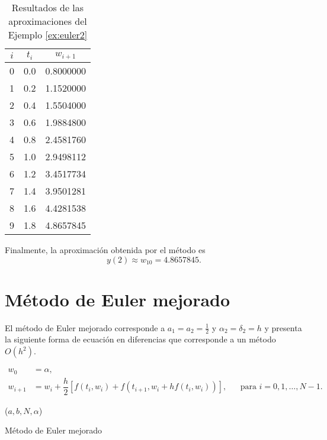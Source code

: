 \begin{exerciseT}
{	\begin{table}[H]
    	\centering
      	\begin{tabular}{ccc}
      		\toprule
      		$i$ & $t_i$ & $w_{i+1}$ \\
      		\midrule
			0 & 0.0 & 0.8000000 \\
			1 & 0.2 & 1.1520000 \\
			2 & 0.4 & 1.5504000 \\
			3 & 0.6 & 1.9884800 \\
			4 & 0.8 & 2.4581760 \\
			5 & 1.0 & 2.9498112 \\
			6 & 1.2 & 3.4517734 \\
			7 & 1.4 & 3.9501281 \\
			8 & 1.6 & 4.4281538 \\
			9 & 1.8 & 4.8657845 \\
			\bottomrule
      	\end{tabular}
      	\caption{Resultados de las aproximaciones del Ejemplo \ref{ex:euler2}}
      	\label{table:resultadosEjemplo2Euler}
  	\end{table} 
  	
Finalmente, la aproximación obtenida por el método es \[y(2) \approx w_{10} = 4.8657845.\]
\label{ex:euler2}
}\end{exerciseT}

\section{Método de Euler mejorado}
El método de Euler mejorado corresponde a $a_1=a_2=\frac{1}{2}$ y $\alpha_2 = \delta_2 = h$ y presenta la siguiente forma de 
ecuación en diferencias que corresponde a un método $O(h^2)$.

\begin{definition}
	\begin{align*}
		w_0 &= \alpha,\\
		w_{i+1} &= w_i + \dfrac{h}{2}\left[f(t_i,w_i) + f(t_{i+1}, w_i + hf(t_i,w_i))\right], && \mbox{para } i=0,1,\dots,N-1.
	\end{align*}
\end{definition}

\begin{algorithm}[h]
	\eulermejorado ($a,b,N,\alpha$) 
\caption{Método de Euler mejorado}
\label{algo:EulerMejorado}
\end{algorithm}


